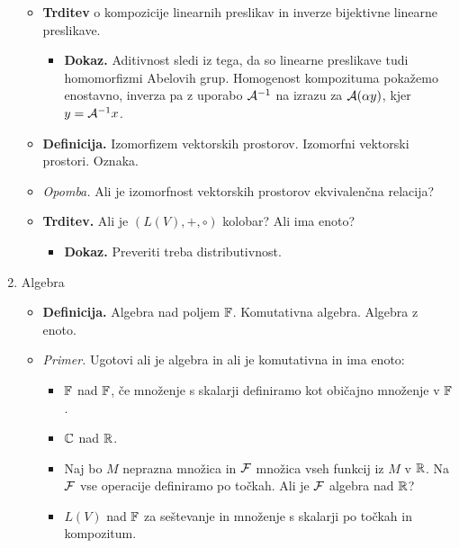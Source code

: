 \begin{enumerate}
\begin{itemize}
\begin{itemize}
        \end{itemize}
        \item \colorbox{blue!30}{\textbf{Trditev}} o kompozicije linearnih preslikav in inverze bijektivne linearne preslikave.
        \begin{itemize}
            \item \colorbox{green!30}{\textbf{Dokaz.}} Aditivnost sledi iz tega, da so linearne preslikave tudi homomorfizmi Abelovih grup. Homogenost kompozituma pokažemo enostavno, inverza pa z uporabo $\mathcal{A}^{-1}$ na izrazu za $\mathcal{A} (\alpha y)$, kjer $y = \mathcal{A}^{-1}x$.
        \end{itemize}
        \item \colorbox{purple!30}{\textbf{Definicija.}} Izomorfizem vektorskih prostorov. Izomorfni vektorski prostori. Oznaka. 
        \item \colorbox{yellow!30}{\emph{Opomba.}} Ali je izomorfnost vektorskih prostorov ekvivalenčna relacija?
        \item \colorbox{blue!30}{\textbf{Trditev.}} Ali je $(L(V), +, \circ)$ kolobar? Ali ima enoto?
        \begin{itemize}
            \item \colorbox{green!30}{\textbf{Dokaz.}} Preveriti treba distributivnost.
        \end{itemize}
    \end{itemize}

    \item Algebra
    \begin{itemize}
        \item \colorbox{purple!30}{\textbf{Definicija.}} Algebra nad poljem $\mathbb{F}$. Komutativna algebra. Algebra z enoto.
        \item \colorbox{yellow!30}{\emph{Primer.}} Ugotovi ali je algebra in ali je komutativna in ima enoto:
        \begin{itemize}
            \item $\mathbb{F}$ nad $\mathbb{F}$, če množenje s skalarji definiramo kot običajno množenje v $\mathbb{F}$.
            \item $\mathbb{C}$ nad $\mathbb{R}$.            
            \item Naj bo $M$ neprazna množica in $\mathcal{F}$ množica vseh funkcij iz $M$ v $\mathbb{R}$. Na $\mathcal{F}$ vse operacije definiramo po točkah. Ali je $\mathcal{F}$ algebra nad $\mathbb{R}$?            
            \item $L(V)$ nad $\mathbb{F}$ za seštevanje in množenje s skalarji po točkah in kompozitum.
        \end{itemize}
    \end{itemize}
\end{enumerate}